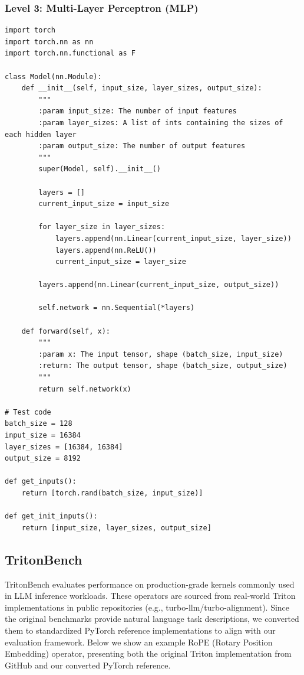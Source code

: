 \subsubsection{Level 3: Multi-Layer Perceptron (MLP)}
\begin{mdframed}[linewidth=1pt, linecolor=black, backgroundcolor=gray!5]
\begin{lstlisting}
import torch
import torch.nn as nn
import torch.nn.functional as F

class Model(nn.Module):
    def __init__(self, input_size, layer_sizes, output_size):
        """
        :param input_size: The number of input features
        :param layer_sizes: A list of ints containing the sizes of each hidden layer
        :param output_size: The number of output features
        """
        super(Model, self).__init__()
        
        layers = []
        current_input_size = input_size
        
        for layer_size in layer_sizes:
            layers.append(nn.Linear(current_input_size, layer_size))
            layers.append(nn.ReLU())
            current_input_size = layer_size
        
        layers.append(nn.Linear(current_input_size, output_size))
        
        self.network = nn.Sequential(*layers)
    
    def forward(self, x):
        """
        :param x: The input tensor, shape (batch_size, input_size)
        :return: The output tensor, shape (batch_size, output_size)
        """
        return self.network(x)

# Test code
batch_size = 128
input_size = 16384
layer_sizes = [16384, 16384]
output_size = 8192

def get_inputs():
    return [torch.rand(batch_size, input_size)]

def get_init_inputs():
    return [input_size, layer_sizes, output_size]
\end{lstlisting}
\end{mdframed}

\subsection{TritonBench}

TritonBench evaluates performance on production-grade kernels commonly used in LLM inference workloads. These operators are sourced from real-world Triton implementations in public repositories (e.g., turbo-llm/turbo-alignment). Since the original benchmarks provide natural language task descriptions, we converted them to standardized PyTorch reference implementations to align with our evaluation framework. Below we show an example RoPE (Rotary Position Embedding) operator, presenting both the original Triton implementation from GitHub and our converted PyTorch reference.

